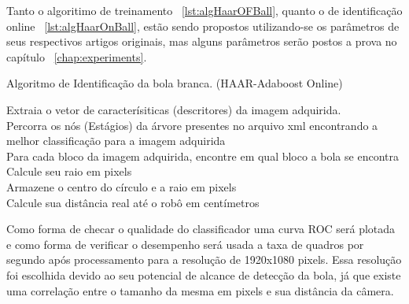 Tanto o algoritimo de treinamento ~\ref{lst:algHaarOFBall}, quanto o de identificação online ~\ref{lst:algHaarOnBall}, estão sendo propostos utilizando-se os parâmetros de seus respectivos artigos originais, mas alguns parâmetros serão postos a prova no capítulo ~\ref{chap:experiments}.

\begin{algorithm}

\caption{Algoritmo de Identificação da bola branca. (HAAR-Adaboost Online)}\label{lst:algHaarOnBall}



{

Extraia o vetor de caracterísiticas (descritores) da imagem adquirida.\\
Percorra os nós (Estágios) da árvore presentes no arquivo xml encontrando a melhor classificação para a imagem adquirida\\

	{
		Para cada bloco da imagem adquirida, encontre em qual bloco a bola se encontra\\

		Calcule seu raio em pixels\\

		Armazene o centro do círculo e a raio em pixels\\

		Calcule sua distância real até o robô em centímetros\\
	}
}





\end{algorithm}

Como forma de checar o qualidade do classificador uma curva ROC será plotada e como forma de verificar o desempenho será usada a taxa de quadros por segundo após processamento para a resolução de 1920x1080 pixels. Essa resolução foi escolhida devido ao seu potencial de alcance de detecção da bola, já que existe uma correlação entre o tamanho da mesma em pixels e sua distância da câmera.



